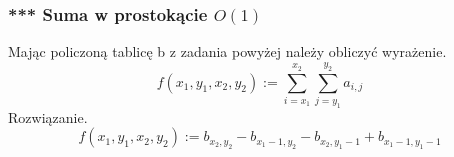 \documentclass{article}
\begin{document}
\subsubsection{*** Suma w prostokącie $O(1)$}
Mając policzoną tablicę b z zadania powyżej należy obliczyć wyrażenie.
\begin{displaymath}
f(x_1, y_1, x_2, y_2) := \sum_{ i = x_1 } ^ { x_2 } \sum_{ j = y_1 }^ {y_2} a_{i, j}
\end{displaymath}
Rozwiązanie. 
\begin{displaymath}
f(x_1, y_1, x_2, y_2) := b_{x_2, y_2} - b_{x_1 - 1, y_2} - b_{x_2, y_1 - 1} + b_{x_1 - 1, y_1 - 1}
\end{displaymath}

\end{document}
